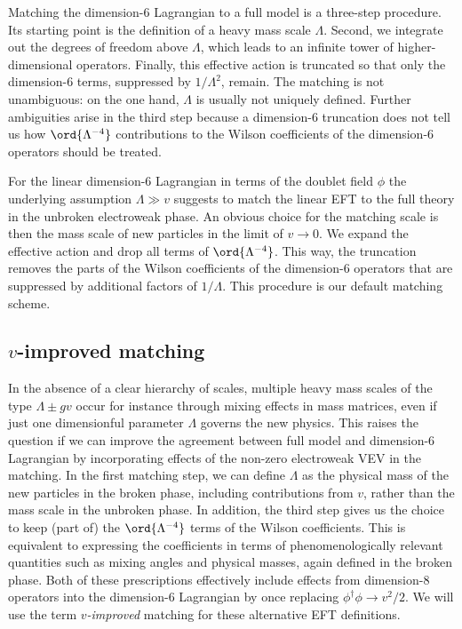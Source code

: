 Matching the dimension-6 Lagrangian to a full model is a three-step
procedure.  Its starting point is the definition of a heavy mass scale
$\Lambda$.  Second, we integrate out the degrees of freedom above
$\Lambda$, which leads to an infinite tower of higher-dimensional
operators.  Finally, this effective action is truncated so that only
the dimension-6 terms, suppressed by $1 / \Lambda^2$, remain.  The
matching is not unambiguous: on the one hand, $\Lambda$ is usually not
uniquely defined.  Further ambiguities arise in the third step because
a dimension-6 truncation does not tell us how $\ord{\Lambda^{-4}}$
contributions to the Wilson coefficients of the dimension-6 operators
should be treated.  \medskip

For the linear dimension-6 Lagrangian in terms of the doublet field
$\phi$ the underlying assumption $\Lambda \gg v$ suggests to match the
linear EFT to the full theory in the unbroken electroweak phase. An
obvious choice for the matching scale is then the mass scale of new
particles in the limit of $v \to 0$. We expand the effective action
and drop all terms of $\ord{\Lambda^{-4}}$.  This way, the truncation
removes the parts of the Wilson coefficients of the dimension-6
operators that are suppressed by additional factors of $1/ \Lambda$.
This procedure is our default matching scheme.


\subsection{$v$-improved matching}

In the absence of a clear hierarchy of scales, multiple heavy mass
scales of the type $\Lambda \pm g v$ occur for instance through mixing
effects in mass matrices, even if just one dimensionful parameter
$\Lambda$ governs the new physics.  This raises the question if we can
improve the agreement between full model and dimension-6 Lagrangian by
incorporating effects of the non-zero electroweak VEV in the matching.
In the first matching step, we can define $\Lambda$ as the physical
mass of the new particles in the broken phase, including contributions
from $v$, rather than the mass scale in the unbroken phase. In
addition, the third step gives us the choice to keep (part of) the
$\ord{\Lambda^{-4}}$ terms of the Wilson coefficients. This is
equivalent to expressing the coefficients in terms of
phenomenologically relevant quantities such as mixing angles and
physical masses, again defined in the broken phase.  Both of these
prescriptions effectively include effects from dimension-8 operators
into the dimension-6 Lagrangian by once replacing $\phi^\dagger \phi
\to v^2 / 2$.  We will use the term \emph{$v$-improved} matching for
these alternative EFT definitions.  \medskip

